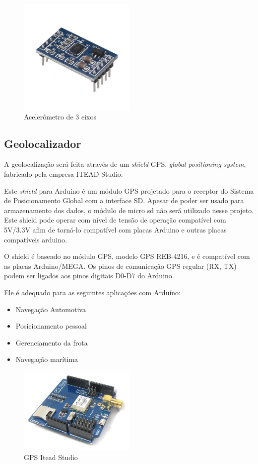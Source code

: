 \documentclass[final,12pt, times, 5p, twocolumn]{elsarticle}
\begin{document}
\begin{figure}[ht!]
\centering
\includegraphics[width=0.5\textwidth]{acelerometro.jpg}
\caption{\label{fig:acelerometro}Acelerômetro de 3 eixos}
\end{figure}

\subsection{Geolocalizador}

A geolocalização será feita através de um \textit{shield} GPS, \textit{global positioning system}, fabricado pela empresa ITEAD Studio.

Este \textit{shield} para Arduino é um módulo GPS projetado para o receptor do Sistema de Posicionamento Global com a interface SD. Apesar de poder ser usado para armazenamento dos dados, o módulo de micro sd não será utilizado nesse projeto. Este shield pode operar com nível de tensão de operação compatível com  5V/3.3V afim de torná-lo compatível com placas Arduino e outras placas compatíveis arduino.

O shield é baseado no módulo GPS, modelo GPS REB-4216, e é compatível com as placas Arduino/MEGA. Os pinos de comunicação GPS regular (RX, TX) podem ser ligados aos pinos digitais D0-D7 do Arduino.

Ele é adequado para as seguintes aplicações com Arduíno:

\begin{itemize}
     \item Navegação Automotiva
     \item Posicionamento pessoal
     \item Gerenciamento da frota
     \item Navegação marítima
\end{itemize}

\begin{figure}[ht!]
\centering
\includegraphics[width=0.5\textwidth]{gps.jpg}
\caption{\label{fig:gps}GPS Itead Studio}
\end{figure}
\end{document}
